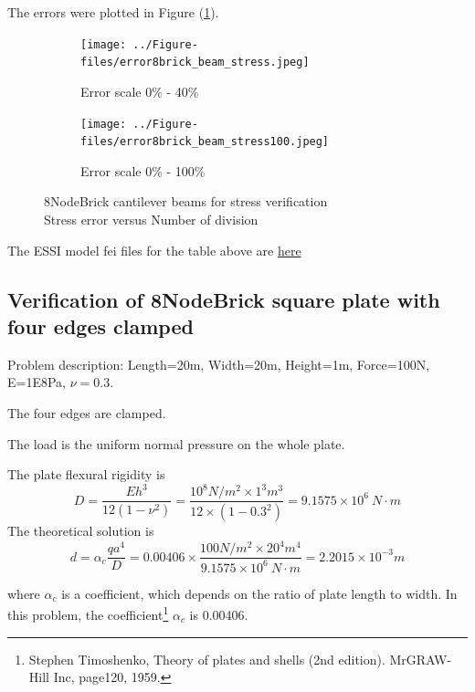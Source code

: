 \documentclass[fleqn,11pt]{article}
\begin{document}
The errors were plotted in Figure (\ref{fig 8NodeBrick cantilever beams for stress verification}).
\begin{figure}[H]
  \begin{subfigure}{0.5\textwidth}
    \centering
    \texttt{[image: ../Figure-files/error8brick\_beam\_stress.jpeg]}
    \caption{Error scale 0\% - 40\%}
  \end{subfigure}
  \begin{subfigure}{0.5\textwidth}
    \centering
    \texttt{[image: ../Figure-files/error8brick\_beam\_stress100.jpeg]}
    \caption{Error scale 0\% - 100\%}
  \end{subfigure}
  \captionsetup{justification=centering,margin=3cm}
  \caption{8NodeBrick cantilever beams for stress verification\\
      Stress error   versus   Number of division}
  \label{fig 8NodeBrick cantilever beams for stress verification}
\end{figure}


The ESSI model fei files for the table above are \href{https://github.com/yuan-energy/ESSI_Verification/blob/master/8NodeBrick/cantilever_stress/cantilever_stress.tar.gz?raw=true}{here}




\newpage
\subsection{Verification of 8NodeBrick square plate with four edges clamped}

Problem description: Length=20m, Width=20m, Height=1m, Force=100N, E=1E8Pa, $\nu=0.3$. 

The four edges are clamped. 

The load is the uniform normal pressure on the whole plate. 


The plate flexural rigidity is 
\begin{equation}
  D=\frac{Eh^3}{12(1-\nu^2)}=\frac{10^8 N/m^2 \times 1^3 m^3 }{12 \times (1-0.3^2) }= 9.1575 \times 10^6 \ N\cdot m
\end{equation}
The theoretical solution is 
\begin{equation}
  d=\alpha_c \frac{q a^4}{D}=0.00406\times \frac{100 N/m^2 \times 20^4 m^4}{9.1575 \times 10^6 \ N\cdot m}=2.2015\times 10^{-3} m
\end{equation}

where $\alpha_c$ is a coefficient, which depends on the ratio of plate length to width. In this problem, the coefficient\footnote{Stephen Timoshenko, Theory of plates and shells (2nd edition). MrGRAW-Hill Inc, page120, 1959.} $\alpha_c$ is 0.00406.
\end{document}
